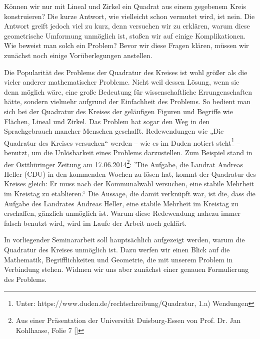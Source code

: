 Können wir nur mit Lineal und Zirkel ein Quadrat aus einem gegebenem Kreis konstruieren? Die kurze Antwort, wie vielleicht schon vermutet wird, ist nein. Die Antwort greift jedoch viel zu kurz, denn versuchen wir zu erklären, warum diese geometrische Umformung unmöglich ist, stoßen wir auf einige Komplikationen. Wie beweist man solch ein Problem? Bevor wir diese Fragen klären, müssen wir zunächst noch einige Vorüberlegungen anstellen. \par
Die Popularität des Problems der Quadratur des Kreises ist wohl größer als die vieler anderer mathematischer Probleme. Nicht weil dessen Lösung, wenn sie denn möglich wäre, eine große Bedeutung für wissenschaftliche Errungenschaften hätte, sondern vielmehr aufgrund der Einfachheit des Problems. So bedient man sich bei der Quadratur des Kreises der geläufigen Figuren und Begriffe wie Flächen, Lineal und Zirkel. Das Problem hat sogar den Weg in den Sprachgebrauch mancher Menschen geschafft. Redewendungen wie „Die Quadratur des Kreises versuchen“ werden -- wie es im Duden notiert steht\footnote{Unter: https://www.duden.de/rechtschreibung/Quadratur, 1.a) Wendungen} -- benutzt, um die Unlösbarkeit eines Problems darzustellen. Zum Beispiel stand in der Ostthüringer Zeitung am 17.06.2014\footnote{Aus einer Präsentation der Universität Duisburg-Essen von Prof. Dr. Jan Kohlhaase, Folie 7 [\UniPresentationInt]}: ”Die Aufgabe, die Landrat Andreas Heller (CDU) in den kommenden Wochen zu lösen hat, kommt der Quadratur des Kreises gleich: Er muss nach der Kommunalwahl versuchen, eine stabile Mehrheit im Kreistag zu etablieren.“ Die Aussage, die damit verknüpft war, ist die, dass die Aufgabe des Landrates Andreas Heller, eine stabile Mehrheit im Kreistag zu erschaffen, gänzlich unmöglich ist. Warum diese Redewendung nahezu immer falsch benutzt wird, wird im Laufe der Arbeit noch geklärt. \par In vorliegender Seminararbeit soll hauptsächlich aufgezeigt werden, warum die Quadratur des Kreises unmöglich ist. Dazu werfen wir einen Blick auf die Mathematik, Begrifflichkeiten und Geometrie, die mit unserem Problem in Verbindung stehen. Widmen wir uns aber zunächst einer genauen Formulierung des Problems. \par
